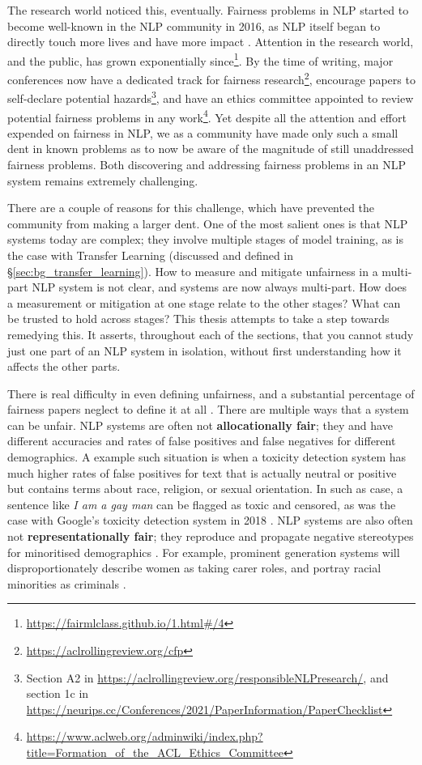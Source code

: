 The research world noticed this, eventually. Fairness problems in NLP started to become well-known in the NLP community in 2016, as NLP itself began to directly touch more lives and have more impact \citep{hovy-spruit-2016-social}. Attention in the research world, and the public, has grown exponentially since\footnote{\url{https://fairmlclass.github.io/1.html\#/4}}. By the time of writing, major conferences now have a dedicated track for fairness research\footnote{\url{https://aclrollingreview.org/cfp}}, encourage papers to self-declare potential hazards\footnote{Section A2 in \url{https://aclrollingreview.org/responsibleNLPresearch/}, and section 1c in \url{https://neurips.cc/Conferences/2021/PaperInformation/PaperChecklist}}, and have an ethics committee appointed to review potential fairness problems in any work\footnote{\url{https://www.aclweb.org/adminwiki/index.php?title=Formation_of_the_ACL_Ethics_Committee}}. Yet despite all the attention and effort expended on fairness in NLP, we as a community have made only such a small dent in known problems as to now be aware of the magnitude of still unaddressed fairness problems. Both discovering and addressing fairness problems in an NLP system remains extremely challenging. 

There are a couple of reasons for this challenge, which have prevented the community from making a larger dent. One of the most salient ones is that NLP systems today are complex; they involve multiple stages of model training, as is the case with Transfer Learning (discussed and defined in \S\ref{sec:bg_transfer_learning}). How to measure and mitigate unfairness in a multi-part NLP system is not clear, and systems are now always multi-part. How does a measurement or mitigation at one stage relate to the other stages? What can be trusted to hold across stages? This thesis attempts to take a step towards remedying this. It asserts, throughout each of the sections, that you cannot study just one part of an NLP system in isolation, without first understanding how it affects the other parts. 

There is real difficulty in even defining unfairness, and a substantial percentage of fairness papers neglect to define it at all \citep{blodgett-etal-2020-language, goldfarb-tarrant-etal-2023-prompt}. There are multiple ways that a system can be unfair. NLP systems are often not \textbf{allocationally fair}; they and have different accuracies and rates of false positives and false negatives for different demographics. A example such situation is when a toxicity detection system has much higher rates of false positives for text that is actually neutral or positive but contains terms about race, religion, or sexual orientation. In such as case, a sentence like \textit{I am a gay man} can be flagged as toxic and censored, as was the case with Google's toxicity detection system in 2018 \citep{Dixon2018MeasuringAM}. NLP systems are also often not \textbf{representationally fair}; they reproduce and propagate negative stereotypes for minoritised demographics \citep{crawford_keynote}. For example, prominent generation systems will disproportionately describe women as taking carer roles, and portray racial minorities as criminals \citep{sheng-etal-2019-woman}. 

